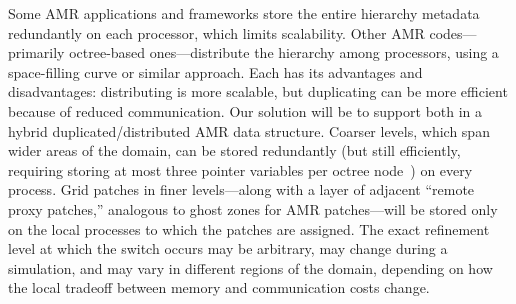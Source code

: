 \documentclass[11pt,letterpaper]{article}
\begin{document}

%
Some AMR applications and frameworks store the entire hierarchy
metadata redundantly on each processor, which limits scalability.
Other AMR codes---primarily octree-based ones---distribute the
hierarchy among processors, using a space-filling curve or similar
approach.  Each has its advantages and disadvantages: distributing is
more scalable, but duplicating can be more efficient because of
reduced communication.
Our solution will be to support both in a hybrid
duplicated/distributed AMR data structure.  Coarser levels, which span
wider areas of the domain, can be stored redundantly (but still
efficiently, requiring storing at most three pointer variables per
octree node~\cite{FrPe02}) on every process.  Grid patches in finer
levels---along with a layer of adjacent ``remote proxy patches,''
analogous to ghost zones for AMR patches---will be stored only on the
local processes to which the patches are assigned.  The exact
refinement level at which the switch occurs may be arbitrary, may
change during a simulation, and may vary in different regions of the
domain, depending on how the local tradeoff between memory and
communication costs change.
\end{document}
